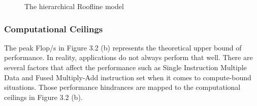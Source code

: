 \begin{figure}
  \centering
  \hspace{0.000001in}
  \caption{The hierarchical Roofline model}
  \label{fig:subfig} %
\end{figure}

\subsubsection{Computational Ceilings}
The peak Flop/s in Figure 3.2 (b) represents the theoretical upper bound of performance. In reality, applications do not always perform that well. There are several factors that affect the performance such as Single Instruction Multiple Data and Fused Multiply-Add instruction set when it comes to compute-bound situations. Those performance hindrances are mapped to the computational ceilings in Figure 3.2 (b).

